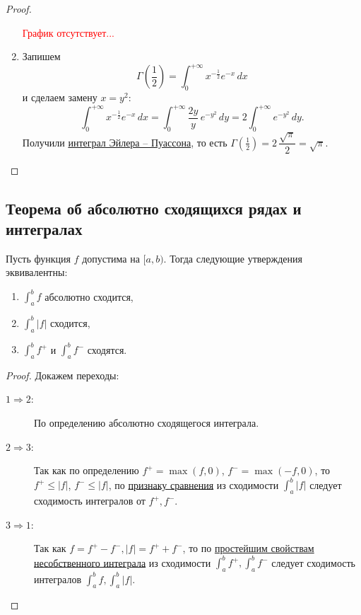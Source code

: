 \begin{proof}
\begin{enumerate}
		\textcolor{red}{График отсутствует...}
		\item Запишем \[
		\Gamma \left(\frac{1}{2} \right) = \int_{0}^{+\infty} x^{-\frac{1}{2}} e^{-x} \, dx
		\]
		и сделаем замену \(x = y^2\): \[
		\int_{0}^{+\infty} x^{-\frac{1}{2}} e^{-x} \, dx = \int_{0}^{+\infty} \frac{2y}{y} \, e^{-y^2} \, dy = 2 \int_{0}^{+\infty} e^{-y^2} \, dy.
		\]
		Получили \hyperlink{puas}{интеграл Эйлера -- Пуассона}, то есть \(\Gamma \left(\frac{1}{2} \right) = 2 \, \dfrac{\sqrt{\pi}}{2} = \sqrt{\pi}\).
	\end{enumerate}
\end{proof}

\subsection{Теорема об абсолютно сходящихся рядах и интегралах}

\begin{ntheorem} \hypertarget{t42}{}
	Пусть функция \(f\) допустима на \([a, b)\). Тогда следующие утверждения эквивалентны:
	\begin{enumerate}
		\item \(\int_{a}^{b} f\) абсолютно сходится,
		\item \(\int_{a}^{b} |f|\) сходится,
		\item \(\int_{a}^{b} f^+\) и \(\int_{a}^{b} f^-\) сходятся.
	\end{enumerate} 
\end{ntheorem}
\begin{proof}
	Докажем переходы:
	\begin{description}
		\item[\(1 \Rightarrow 2\):] По определению абсолютно сходящегося интеграла.
		\item[\(2 \Rightarrow 3\):] Так как по определению \(f^+ = \max (f, 0)\), \(f^- = \max (-f, 0)\), то \(f^+ \leqslant |f|\), \(f^- \leqslant |f|\), по \hyperlink{priz}{признаку сравнения} из сходимости \(\int_{a}^{b} |f|\) следует сходимость интегралов от \(f^+, f^-\).
		\item[\(3 \Rightarrow 1\):] Так как \(f = f^+ - f^-, |f| = f^+ + f^-\), то по \hyperlink{svva}{простейшим свойствам несобственного интеграла} из сходимости \(\int_{a}^{b} f^+, \int_{a}^{b} f^-\) следует сходимость интегралов \(\int_{a}^{b} f, \int_{a}^{b} |f|\).
	\end{description}
\end{proof}

